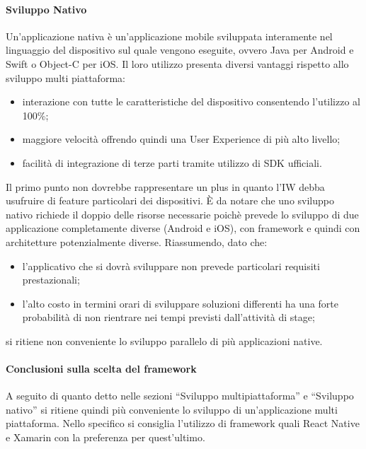 \paragraph{Sviluppo Nativo}
Un’applicazione nativa è un’applicazione mobile sviluppata interamente nel linguaggio del dispositivo sul quale vengono eseguite, ovvero Java per Android e Swift o Object-C per iOS. Il loro utilizzo presenta diversi vantaggi rispetto allo sviluppo multi piattaforma:
\begin{itemize}
    \item interazione con tutte le caratteristiche del dispositivo consentendo l’utilizzo al 100\%;
    \item maggiore velocità offrendo quindi una User Experience di più alto livello;
    \item facilità di integrazione di terze parti tramite utilizzo di SDK ufficiali. 
\end{itemize}
Il primo punto non dovrebbe rappresentare un plus in quanto l’IW debba usufruire di feature particolari dei dispositivi. 
È da notare che uno sviluppo nativo richiede il doppio delle risorse necessarie poichè prevede lo sviluppo di due applicazione completamente diverse (Android e iOS), con framework e quindi con architetture potenzialmente diverse. 
Riassumendo, dato che: 
\begin{itemize}
    \item l’applicativo che si dovrà sviluppare non prevede particolari requisiti prestazionali;
    \item l’alto costo in termini orari di sviluppare soluzioni differenti ha una forte probabilità di non rientrare nei tempi previsti dall’attività di stage;
\end{itemize}
 si ritiene non conveniente lo sviluppo parallelo di più applicazioni native. 
\paragraph{Conclusioni sulla scelta del framework}
A seguito di quanto detto nelle sezioni “Sviluppo multipiattaforma” e “Sviluppo nativo” si ritiene quindi più conveniente lo sviluppo di un’applicazione multi piattaforma. Nello specifico si consiglia l’utilizzo di framework quali React Native e Xamarin con la preferenza per quest’ultimo.
